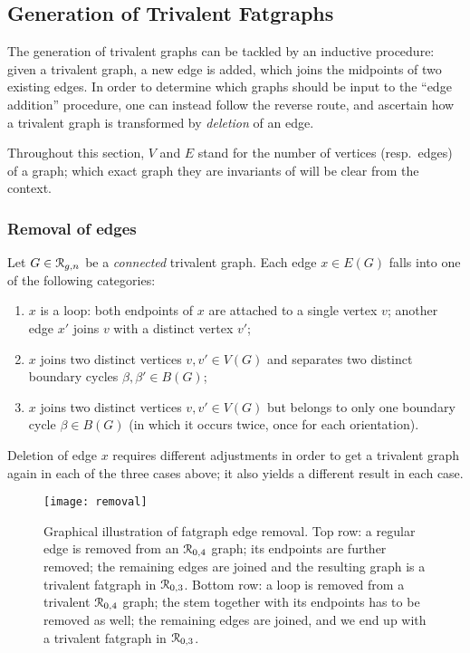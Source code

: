 \subsection{Generation of Trivalent Fatgraphs}
\label{sec:stage1-trivalent}

The generation of trivalent graphs can be tackled by an inductive
procedure: given a trivalent graph, a new edge is added, which joins
the midpoints of two existing edges.  
In order to determine which graphs should be input to the ``edge
addition'' procedure, one can instead follow the reverse route, and
ascertain how a trivalent graph is transformed by \emph{deletion} of
an edge.

Throughout this section, $V$ and $E$ stand for the number of vertices
(resp.~edges) of a graph; which exact graph they are invariants of
will be clear from the context.

\subsubsection{Removal of edges}
\label{sec:removal}

Let $G \in \mathcal{R}_{g,n}$ be a \emph{connected} trivalent graph. Each edge
$x \in E(G)$ falls into one of the following categories:
\begin{enumerate}[\slshape A)]
\item $x$ is a loop: both endpoints of $x$ are
  attached to a single vertex $v$; another edge $x'$ joins $v$ with a
  distinct vertex $v'$;
\item $x$ joins two distinct vertices $v, v'
  \in V(G)$ and separates two distinct boundary cycles $\beta, \beta'
  \in B(G)$;
\item $x$ joins two distinct vertices $v, v'
  \in V(G)$ but belongs to only one boundary cycle $\beta \in B(G)$
  (in which it occurs twice, once for each orientation).
\end{enumerate}
Deletion of edge $x$ requires different adjustments in order to get a
trivalent graph again in each of the three cases above; it also yields
a different result in each case.
\begin{figure}
  \centering
  \texttt{[image: removal]}
  \caption{Graphical illustration of fatgraph edge removal.  Top row: a regular edge is removed from an $\mathcal{R}_{0,4}$ graph; its endpoints are further removed; the remaining edges are joined and the resulting graph is a trivalent fatgraph in $\mathcal{R}_{0,3}$.  Bottom row: a loop is removed from a trivalent $\mathcal{R}_{0,4}$ graph; the stem together with its endpoints has to be removed as well; the remaining edges are joined, and we end up with a trivalent fatgraph in $\mathcal{R}_{0,3}$.}
  \label{fig:removal}
\end{figure}

